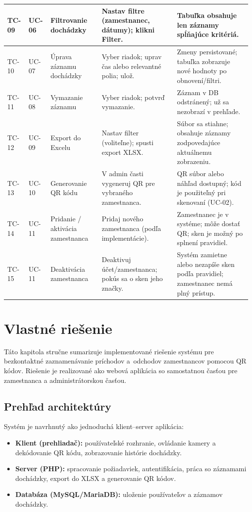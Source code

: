 \begin{longtable}{|p{1.0cm}|p{1.0cm}|p{3.0cm}|p{3.5cm}|p{4.8cm}|}
\hline
TC-09 & UC-06 & Filtrovanie dochádzky &
Nastav filtre (zamestnanec, dátumy); klikni Filter. &
Tabuľka obsahuje len záznamy spĺňajúce kritériá. \\
\hline
TC-10 & UC-07 & Úprava záznamu dochádzky &
Vyber riadok; uprav čas alebo relevantné polia; ulož. &
Zmeny persistované; tabuľka zobrazuje nové hodnoty po obnovení/filtri. \\
\hline
TC-11 & UC-08 & Vymazanie záznamu &
Vyber riadok; potvrď vymazanie. &
Záznam v DB odstránený; už sa nezobrazí v prehľade. \\
\hline
TC-12 & UC-09 & Export do Excelu &
Nastav filter (voliteľne); spusti export XLSX. &
Súbor sa stiahne; obsahuje záznamy zodpovedajúce aktuálnemu zobrazeniu. \\
\hline
TC-13 & UC-10 & Generovanie QR kódu &
V admin časti vygeneruj QR pre vybraného zamestnanca. &
QR súbor alebo náhľad dostupný; kód je použiteľný pri skenovaní (UC-02). \\
\hline
TC-14 & UC-11 & Pridanie / aktivácia zamestnanca &
Pridaj nového zamestnanca (podľa implementácie). &
Zamestnanec je v systéme; môže dostať QR; sken je možný po splnení pravidiel. \\
\hline
TC-15 & UC-11 & Deaktivácia zamestnanca &
Deaktivuj účet/zamestnanca; pokús sa o sken jeho značky. &
Systém zamietne alebo nezapíše sken podľa pravidiel; zamestnanec nemá plný prístup. \\
\hline
\end{longtable}

\section{Vlastné riešenie}

Táto kapitola stručne sumarizuje implementované riešenie systému pre bezkontaktné zaznamenávanie
príchodov a~odchodov zamestnancov pomocou QR kódov. Riešenie je realizované ako webová aplikácia
so samostatnou časťou pre zamestnanca a administrátorskou časťou.

\subsection{Prehľad architektúry}

Systém je navrhnutý ako jednoduchá klient--server aplikácia:
\begin{itemize}
  \item \textbf{Klient (prehliadač):} používateľské rozhranie, ovládanie kamery a dekódovanie QR kódu,
  zobrazovanie histórie dochádzky.
  \item \textbf{Server (PHP):} spracovanie požiadaviek, autentifikácia, práca so záznamami dochádzky,
  export do XLSX a generovanie QR kódov.
  \item \textbf{Databáza (MySQL/MariaDB):} uloženie používateľov a záznamov dochádzky.
\end{itemize}


